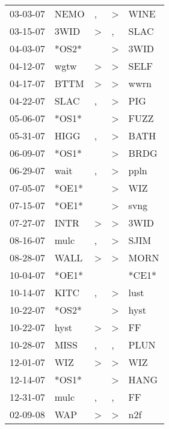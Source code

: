 \begin{supertabular}{lllll}
 03-03-07 &   NEMO &                , &     \textgreater &   WINE \\
 03-15-07 &   3WID &     \textgreater &                , &   SLAC \\
 04-03-07 &  *OS2* &                  &     \textgreater &   3WID \\
 04-12-07 &   wgtw &     \textgreater &     \textgreater &   SELF \\
 04-17-07 &   BTTM &     \textgreater &     \textgreater &   wwrn \\
 04-22-07 &   SLAC &                , &     \textgreater &    PIG \\
 05-06-07 &  *OS1* &                  &     \textgreater &   FUZZ \\
 05-31-07 &   HIGG &                , &     \textgreater &   BATH \\
 06-09-07 &  *OS1* &                  &     \textgreater &   BRDG \\
 06-29-07 &   wait &                , &     \textgreater &   ppln \\
 07-05-07 &  *OE1* &                  &     \textgreater &    WIZ \\
 07-15-07 &  *OE1* &                  &     \textgreater &   svng \\
 07-27-07 &   INTR &     \textgreater &     \textgreater &   3WID \\
 08-16-07 &   mulc &                , &     \textgreater &   SJIM \\
 08-28-07 &   WALL &     \textgreater &     \textgreater &   MORN \\
 10-04-07 &  *OE1* &                  &                  &  *CE1* \\
 10-14-07 &   KITC &                , &     \textgreater &   lust \\
 10-22-07 &  *OS2* &                  &     \textgreater &   hyst \\
 10-22-07 &   hyst &     \textgreater &     \textgreater &     FF \\
 10-28-07 &   MISS &                , &                , &   PLUN \\
 12-01-07 &    WIZ &     \textgreater &     \textgreater &    WIZ \\
 12-14-07 &  *OS1* &                  &     \textgreater &   HANG \\
 12-31-07 &   mulc &                , &                , &     FF \\
 02-09-08 &    WAP &     \textgreater &     \textgreater &    n2f \\

\end{supertabular}
